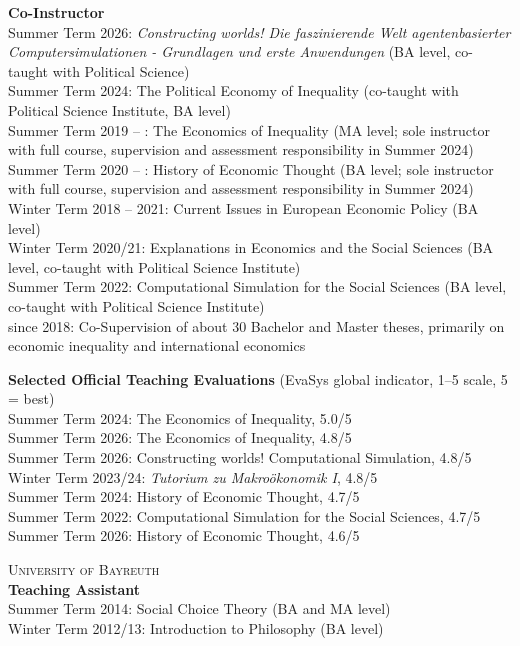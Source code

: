 \documentclass[margin]{res}
\begin{document}
\begin{resume}
	\textbf{Co-Instructor} \\
	Summer Term 2026: \textit{Constructing worlds! Die faszinierende Welt agentenbasierter Computersimulationen - Grundlagen und erste Anwendungen} (BA level, co-taught with Political Science)\\
	Summer Term 2024: The Political Economy of Inequality (co-taught with Political Science Institute, BA level)\\
	Summer Term 2019 -- : The Economics of Inequality (MA level; sole instructor with full course, supervision and assessment responsibility in Summer 2024)\\
	Summer Term 2020 -- : History of Economic Thought (BA level; sole instructor with full course, supervision and assessment responsibility in Summer 2024)\\
	Winter Term 2018 -- 2021: Current Issues in European Economic Policy (BA level)\\
	Winter Term 2020/21: Explanations in Economics and the Social Sciences (BA level, co-taught with Political Science Institute)\\
	Summer Term 2022: Computational Simulation for the Social Sciences (BA level, co-taught with Political Science Institute)\\
	since 2018: Co-Supervision of about 30 Bachelor and Master theses, primarily on economic inequality and international economics
	
	
	\textbf{Selected Official Teaching Evaluations} (EvaSys global indicator, 1--5 scale, 5 = best)\\
	Summer Term 2024: The Economics of Inequality, 5.0/5\\
	Summer Term 2026: The Economics of Inequality, 4.8/5\\
	Summer Term 2026: Constructing worlds! Computational Simulation, 4.8/5\\
	Winter Term 2023/24: \textit{Tutorium zu Makro\"okonomik I}, 4.8/5\\
	Summer Term 2024: History of Economic Thought, 4.7/5\\
	Summer Term 2022: Computational Simulation for the Social Sciences, 4.7/5\\
	Summer Term 2026: History of Economic Thought, 4.6/5
	
	\textsc{University of Bayreuth}\\
	\textbf{Teaching Assistant} \\
	Summer Term 2014: Social Choice Theory (BA and MA level)\\
	Winter Term 2012/13: Introduction to Philosophy (BA level)
	

\end{resume}
\end{document}
